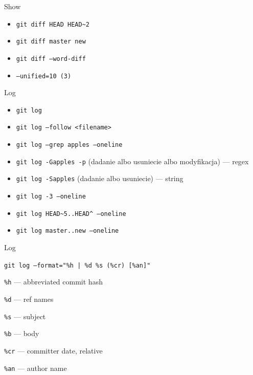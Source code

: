 \documentclass{beamer}
\begin{document}
    \begin{frame}{Show}
        \begin{itemize}[<+-| alert@+>]
            \item\texttt{git diff HEAD HEAD\textasciitilde2}
            \item\texttt{git diff master new}
            \item\texttt{git diff --word-diff}
            \item\texttt{--unified=10 (3)}
        \end{itemize}
    \end{frame}

    \begin{frame}{Log}
        \begin{center}
            \begin{itemize}[<+-| alert@+>]
                \item\texttt{git log}
                \item\texttt{git log --follow <filename>}
                \item\texttt{git log --grep apples --oneline}
                \item\texttt{git log -Gapples -p}  (dadanie albo usuniecie albo modyfikacja) --- regex
                \item\texttt{git log -Sapples} (dadanie albo usuniecie) --- string
                \item\texttt{git log -3 --oneline}
                \item\texttt{git log HEAD\textasciitilde5..HEAD\textasciicircum{} --oneline}
                \item\texttt{git log master..new --oneline}
            \end{itemize}
        \end{center}
    \end{frame}

    \begin{frame}{Log}
        \begin{center}
            \texttt{git log --format="\%h | \%d \%s (\%cr) [\%an]"}
        \end{center}

        \pause
        \texttt{\%h} --- abbreviated commit hash

        \texttt{\%d} --- ref names

        \texttt{\%s} --- subject

        \texttt{\%b} --- body

        \texttt{\%cr} --- committer date, relative

        \texttt{\%an} --- author name
    \end{frame}
\end{document}

